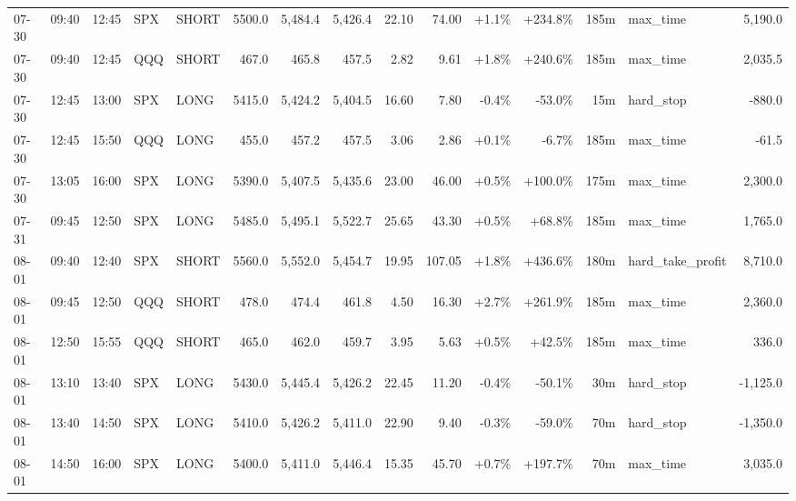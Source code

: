 \documentclass[11pt,a4paper,twoside]{article}
\begin{document}
\begin{landscape}
\begin{center}
\begin{longtable}{>{\color{txtmain}}l l l l l r r r r r r r r >{\color{txtmain}}l r}
07-30 & 09:40 & 12:45 & SPX & SHORT & 5500.0 & 5,484.4 & 5,426.4 & 22.10 & 74.00 & \textcolor{wingreen}{+1.1\%} & \textcolor{wingreen}{+234.8\%} & 185m & max\_time & \textcolor{wingreen}{5,190.0} \\
07-30 & 09:40 & 12:45 & QQQ & SHORT & 467.0 & 465.8 & 457.5 & 2.82 & 9.61 & \textcolor{wingreen}{+1.8\%} & \textcolor{wingreen}{+240.6\%} & 185m & max\_time & \textcolor{wingreen}{2,035.5} \\
07-30 & 12:45 & 13:00 & SPX & LONG & 5415.0 & 5,424.2 & 5,404.5 & 16.60 & 7.80 & \textcolor{lossred}{-0.4\%} & \textcolor{lossred}{-53.0\%} & 15m & hard\_stop & \textcolor{lossred}{-880.0} \\
07-30 & 12:45 & 15:50 & QQQ & LONG & 455.0 & 457.2 & 457.5 & 3.06 & 2.86 & \textcolor{wingreen}{+0.1\%} & \textcolor{lossred}{-6.7\%} & 185m & max\_time & \textcolor{lossred}{-61.5} \\
07-30 & 13:05 & 16:00 & SPX & LONG & 5390.0 & 5,407.5 & 5,435.6 & 23.00 & 46.00 & \textcolor{wingreen}{+0.5\%} & \textcolor{wingreen}{+100.0\%} & 175m & max\_time & \textcolor{wingreen}{2,300.0} \\
07-31 & 09:45 & 12:50 & SPX & LONG & 5485.0 & 5,495.1 & 5,522.7 & 25.65 & 43.30 & \textcolor{wingreen}{+0.5\%} & \textcolor{wingreen}{+68.8\%} & 185m & max\_time & \textcolor{wingreen}{1,765.0} \\
08-01 & 09:40 & 12:40 & SPX & SHORT & 5560.0 & 5,552.0 & 5,454.7 & 19.95 & 107.05 & \textcolor{wingreen}{+1.8\%} & \textcolor{wingreen}{+436.6\%} & 180m & hard\_take\_profit & \textcolor{wingreen}{8,710.0} \\
08-01 & 09:45 & 12:50 & QQQ & SHORT & 478.0 & 474.4 & 461.8 & 4.50 & 16.30 & \textcolor{wingreen}{+2.7\%} & \textcolor{wingreen}{+261.9\%} & 185m & max\_time & \textcolor{wingreen}{2,360.0} \\
08-01 & 12:50 & 15:55 & QQQ & SHORT & 465.0 & 462.0 & 459.7 & 3.95 & 5.63 & \textcolor{wingreen}{+0.5\%} & \textcolor{wingreen}{+42.5\%} & 185m & max\_time & \textcolor{wingreen}{336.0} \\
08-01 & 13:10 & 13:40 & SPX & LONG & 5430.0 & 5,445.4 & 5,426.2 & 22.45 & 11.20 & \textcolor{lossred}{-0.4\%} & \textcolor{lossred}{-50.1\%} & 30m & hard\_stop & \textcolor{lossred}{-1,125.0} \\
08-01 & 13:40 & 14:50 & SPX & LONG & 5410.0 & 5,426.2 & 5,411.0 & 22.90 & 9.40 & \textcolor{lossred}{-0.3\%} & \textcolor{lossred}{-59.0\%} & 70m & hard\_stop & \textcolor{lossred}{-1,350.0} \\
08-01 & 14:50 & 16:00 & SPX & LONG & 5400.0 & 5,411.0 & 5,446.4 & 15.35 & 45.70 & \textcolor{wingreen}{+0.7\%} & \textcolor{wingreen}{+197.7\%} & 70m & max\_time & \textcolor{wingreen}{3,035.0} \\

\end{longtable}
\end{center}
\end{landscape}
\end{document}
